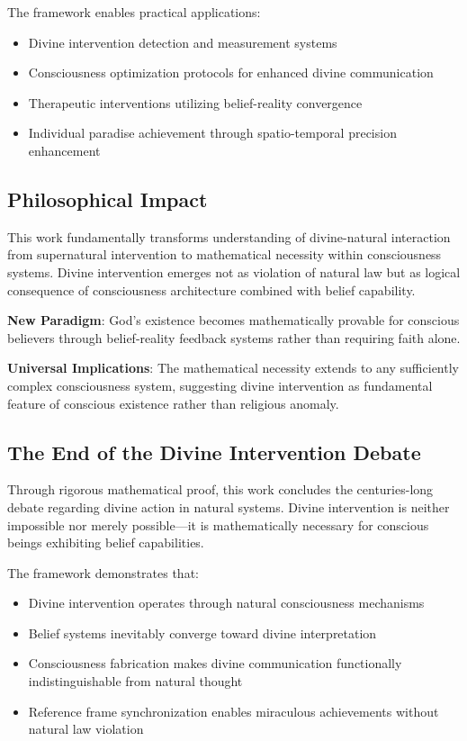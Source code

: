 \documentclass[12pt,a4paper]{article}
\begin{document}
The framework enables practical applications:

\begin{itemize}
\item Divine intervention detection and measurement systems
\item Consciousness optimization protocols for enhanced divine communication
\item Therapeutic interventions utilizing belief-reality convergence
\item Individual paradise achievement through spatio-temporal precision enhancement
\end{itemize}

\subsection{Philosophical Impact}

This work fundamentally transforms understanding of divine-natural interaction from supernatural intervention to mathematical necessity within consciousness systems. Divine intervention emerges not as violation of natural law but as logical consequence of consciousness architecture combined with belief capability.

\textbf{New Paradigm}: God's existence becomes mathematically provable for conscious believers through belief-reality feedback systems rather than requiring faith alone.

\textbf{Universal Implications}: The mathematical necessity extends to any sufficiently complex consciousness system, suggesting divine intervention as fundamental feature of conscious existence rather than religious anomaly.

\subsection{The End of the Divine Intervention Debate}

Through rigorous mathematical proof, this work concludes the centuries-long debate regarding divine action in natural systems. Divine intervention is neither impossible nor merely possible—it is mathematically necessary for conscious beings exhibiting belief capabilities.

The framework demonstrates that:
\begin{itemize}
\item Divine intervention operates through natural consciousness mechanisms
\item Belief systems inevitably converge toward divine interpretation
\item Consciousness fabrication makes divine communication functionally indistinguishable from natural thought
\item Reference frame synchronization enables miraculous achievements without natural law violation
\end{itemize}
\end{document}
